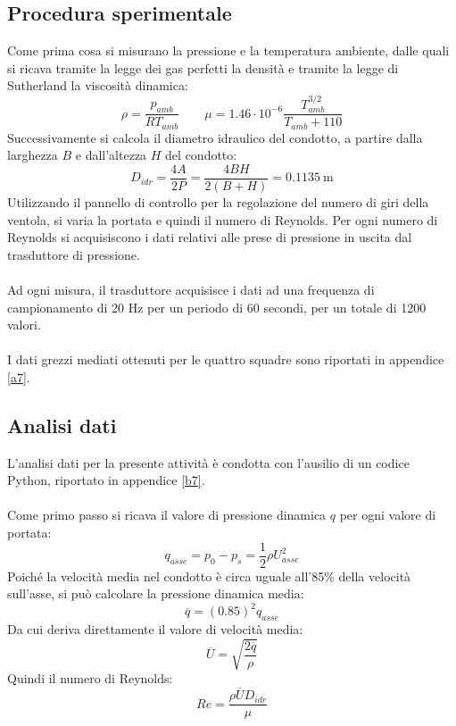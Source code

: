 \newpage
\subsection{Procedura sperimentale}
Come prima cosa si misurano la pressione e la temperatura ambiente, dalle quali si ricava tramite la legge dei gas perfetti la densità e tramite la legge di Sutherland la viscosità dinamica:
\begin{equation*}
    \rho = \frac{p_{amb}}{RT_{amb}} \qquad \mu = 1.46\cdot10^{-6} \frac{T_{amb}^{3/2}}{T_{amb}+110} 
\end{equation*}
Successivamente si calcola il diametro idraulico del condotto, a partire dalla larghezza $B$ e dall'altezza $H$ del condotto:
\begin{equation*}
    D_{idr} = \frac{4A}{2P} = \frac{4BH}{2(B+H)} = 0.1135\ \text{m}
\end{equation*}
Utilizzando il pannello di controllo per la regolazione del numero di giri della ventola, si varia la portata e quindi il numero di Reynolds. Per ogni numero di Reynolds si acquisiscono i dati relativi alle prese di pressione in uscita dal trasduttore di pressione.\\\\
Ad ogni misura, il trasduttore acquisisce i dati ad una frequenza di campionamento di 20 Hz per un periodo di 60 secondi, per un totale di 1200 valori.\\\\
I dati grezzi mediati ottenuti per le quattro squadre sono riportati in appendice \ref{a7}.

\subsection{Analisi dati}
L'analisi dati per la presente attività è condotta con l'ausilio di un codice Python, riportato in appendice \ref{b7}.\\\\
Come primo passo si ricava il valore di pressione dinamica $q$ per ogni valore di portata:
\begin{equation*}
    q_{asse} = p_0 - p_s = \frac12 \rho U_{asse}^2
\end{equation*}
Poiché la velocità media nel condotto è circa uguale all'85\% della velocità sull'asse, si può calcolare la pressione dinamica media:
\begin{equation*}
    \overline q = (0.85)^2 q_{asse} 
\end{equation*}
Da cui deriva direttamente il valore di velocità media:
\begin{equation*}
    \overline U = \sqrt{\frac{2\overline q}\rho}
\end{equation*}
Quindi il numero di Reynolds:
\begin{equation*}
    Re = \frac{\rho \overline U D_{idr}}{\mu}
\end{equation*}

